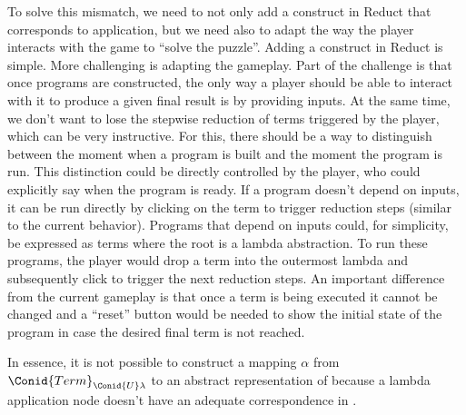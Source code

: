 To solve this mismatch,
we need to not only add a construct in Reduct that corresponds to application,
but we need also to adapt the way the player interacts with the game to ``solve the puzzle''.
% 
Adding a construct in Reduct is simple.
More challenging is adapting the gameplay.
Part of the challenge is that
once programs are constructed, the only way a player should be able to interact with it to produce a given final result is by providing inputs.
%
At the same time, we don't want to lose the stepwise reduction of terms triggered by the player, which can be very instructive.
%
For this, there should be a way to distinguish between the moment when a program is built and the moment the program is run.
This distinction could be directly controlled by the player, who could explicitly say when the program is ready.
If a program doesn't depend on inputs, it can be run directly by clicking on the term to trigger reduction steps (similar to the current behavior).
Programs that depend on inputs could, for simplicity, be expressed as terms where the root is a lambda abstraction.
To run these programs,
the player would drop a term into the outermost lambda and subsequently click to trigger the next reduction steps.
An important difference from the current gameplay is that once a term is being executed it cannot be changed and a ``reset'' button would be needed to show the initial state of the program in case the desired final term is not reached.

In essence,
it is not possible to construct a mapping $\alpha$ from
\ensuremath{\Conid{Term}_{\Conid{U}\lambda}}
to an abstract representation of 
because a lambda application node
doesn't have an adequate correspondence in .




